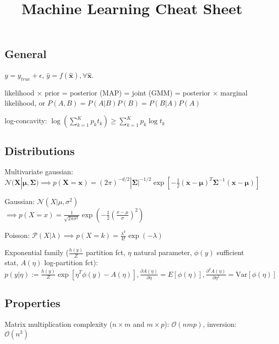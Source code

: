 \documentclass[10pt,a4paper,landscape]{article}
\renewcommand{\bf}[1]{\ensuremath{\mathbf{#1}}}
\newcommand{\Var}{\mathrm{Var}}
\begin{document}
\title{Machine Learning Cheat Sheet}

\raggedright
\footnotesize
\sffamily
\begin{multicols*}{4}

\setlength{\premulticols}{1pt}
\setlength{\postmulticols}{1pt}
\setlength{\multicolsep}{1pt}
\setlength{\columnsep}{2pt}


\section{General}
$y = y_{true} + \epsilon$, $\hat{y} = f(\bf{\hat{x}}), \forall \bf{\hat{x}}$.

likelihood $\times$ prior = posterior (MAP) = joint (GMM) = posterior $\times$ marginal likelihood, or 
$P(A,B) = P(A|B) P(B) = P(B | A) P(A)$

log-concavity: $\log ( \sum_{k=1}^K p_k t_k) \geq \sum_{k=1}^K p_k \log t_k$

\subsection{Distributions}
Multivariate gaussian: $\mathcal{N}(\bf{X} | \bf{\mu} , \bf{\Sigma})
\implies p(\bf{X} = \bf{x}) = (2 \pi)^{-d/2} |\bf{\Sigma|}^{-1/2} \exp{[- \frac{1}{2} (\bf{x} - \bf{\mu})^T \bf{\Sigma}^{-1} (\bf{x} - \bf{\mu})]}$

Gaussian: $\mathcal{N}(X| \mu, \sigma^2)$ \\
$\implies p(X = x) = \frac{1}{\sqrt{2 \pi \sigma^2}} \exp{(- \frac{1}{2} ( \frac{x - \mu}{\sigma} )^2)}$

Poisson: $\mathcal{P}(X| \lambda)
\implies p(X = k) = \frac{\lambda ^ k}{k!} \exp{(- \lambda)}$

Exponential family ($\frac{h(y)}{Z}$ partition fct, $\eta$ natural parameter, $\phi(y)$ sufficient stat, $A(\eta)$ log-partition fct):
$p(y|\eta) := \frac{h(y)}{Z} \exp[\eta^T \phi(y) - A(\eta)], \frac{\partial A(\eta)}{\partial \eta} = E[\phi(\eta)], \frac{\partial^2 A(\eta)}{\partial \eta^2} = \Var[\phi(\eta)]$

\subsection{Properties}
Matrix multiplication complexity ($n \times m$ and $m \times p$): $\mathcal{O}(nmp)$, inversion: $\mathcal{O}(n^3)$


\end{multicols*}
\end{document}
